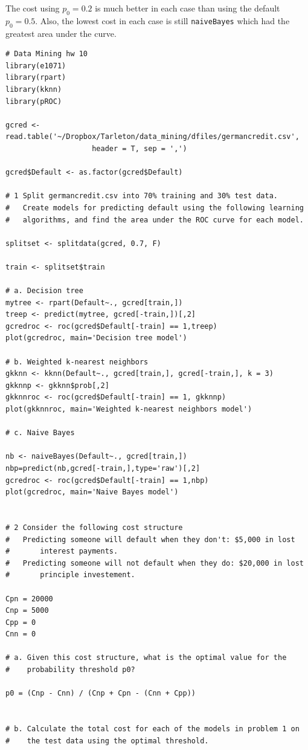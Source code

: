 \documentclass[11pt]{article}
\begin{document}
\begin{enumerate}
\begin{enumerate}
           The cost using $p_0 = 0.2$ is much better in each case than using the default $p_0 = 0.5$. Also, 
           the lowest cost in each case is still \verb|naiveBayes| which had the greatest area under the curve. 

  \end{enumerate}

\begin{Verbatim}
# Data Mining hw 10
library(e1071)
library(rpart)
library(kknn)
library(pROC)

gcred <- read.table('~/Dropbox/Tarleton/data_mining/dfiles/germancredit.csv', 
                    header = T, sep = ',')

gcred$Default <- as.factor(gcred$Default)

# 1 Split germancredit.csv into 70% training and 30% test data. 
#   Create models for predicting default using the following learning 
#   algorithms, and find the area under the ROC curve for each model. 

splitset <- splitdata(gcred, 0.7, F)

train <- splitset$train

# a. Decision tree
mytree <- rpart(Default~., gcred[train,])
treep <- predict(mytree, gcred[-train,])[,2]
gcredroc <- roc(gcred$Default[-train] == 1,treep)
plot(gcredroc, main='Decision tree model')

# b. Weighted k-nearest neighbors
gkknn <- kknn(Default~., gcred[train,], gcred[-train,], k = 3)
gkknnp <- gkknn$prob[,2]
gkknnroc <- roc(gcred$Default[-train] == 1, gkknnp)
plot(gkknnroc, main='Weighted k-nearest neighbors model')

# c. Naive Bayes

nb <- naiveBayes(Default~., gcred[train,])
nbp=predict(nb,gcred[-train,],type='raw')[,2]
gcredroc <- roc(gcred$Default[-train] == 1,nbp)
plot(gcredroc, main='Naive Bayes model')


# 2 Consider the following cost structure
#   Predicting someone will default when they don't: $5,000 in lost 
#       interest payments. 
#   Predicting someone will not default when they do: $20,000 in lost 
#       principle investement. 

Cpn = 20000
Cnp = 5000
Cpp = 0
Cnn = 0

# a. Given this cost structure, what is the optimal value for the 
#    probability threshold p0? 

p0 = (Cnp - Cnn) / (Cnp + Cpn - (Cnn + Cpp))


# b. Calculate the total cost for each of the models in problem 1 on 
#    the test data using the optimal threshold. 


\end{Verbatim}
\end{enumerate}
\end{document}
